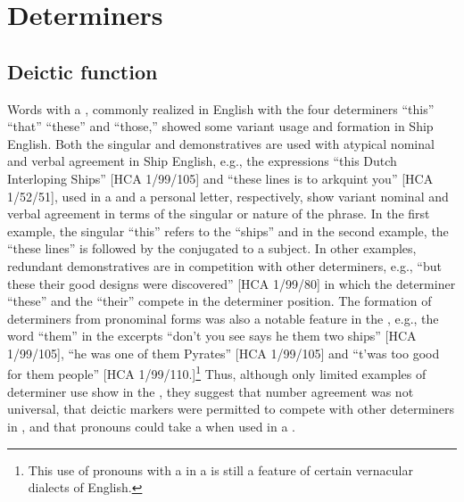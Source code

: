 \section{{Determiners}}\label{sec:5.3}

\subsection{{Deictic function}}\label{sec:5.3.1}

Words with a , commonly realized in English with the four  determiners “this” “that” “these” and “those,” showed some variant usage and formation in Ship English. Both the singular and  demonstratives are used with atypical nominal and verbal agreement in Ship English, e.g., the expressions “this Dutch Interloping Ships” [HCA 1/99/105] and “these lines is to arkquint you” [HCA 1/52/51], used in a  and a personal letter, respectively, show variant nominal and verbal agreement in terms of the singular or  nature of the  phrase. In the first example, the singular  “this” refers to the   “ships” and in the second example, the    “these lines” is followed by the   conjugated to a  subject. In other examples, redundant demonstratives are in competition with other determiners, e.g., “but these their good designs were discovered” [HCA 1/99/80] in which the determiner “these” and the  “their” compete in the determiner position. The formation of  determiners from  pronominal forms was also a notable feature in the , e.g., the word “them” in the excerpts “don’t you see says he them two ships” [HCA 1/99/105], “he was one of them Pyrates” [HCA 1/99/105] and “t’was too good for them people” [HCA 1/99/110.]\footnote{This use of  pronouns with a  in a  is still a feature of certain vernacular dialects of English.} Thus, although only limited examples of determiner use show in the , they suggest that  number agreement was not universal, that deictic markers were permitted to compete with other determiners in , and that  pronouns could take a  when used in a .  

